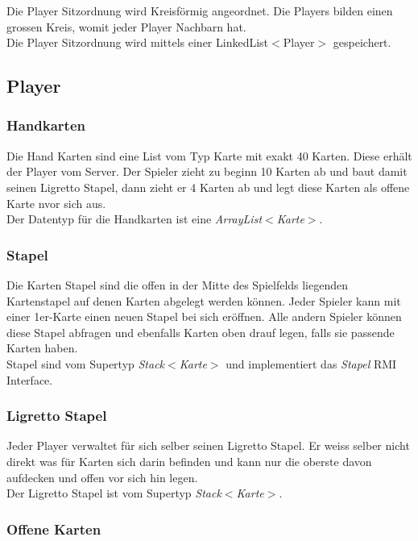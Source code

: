 Die Player Sitzordnung wird Kreisförmig angeordnet. Die Players bilden einen grossen Kreis, womit jeder Player Nachbarn hat. \\[3mm]
Die Player Sitzordnung wird mittels einer LinkedList$<$Player$>$ gespeichert.

\subsection{Player}

\subsubsection{Handkarten}

Die Hand Karten sind eine List vom Typ Karte mit exakt 40 Karten. Diese erhält der Player vom Server. Der Spieler zieht zu beginn 10 Karten ab und baut damit seinen Ligretto Stapel, dann zieht er 4 Karten ab und legt diese Karten als offene Karte nvor sich aus.\\[3mm]
Der Datentyp für die Handkarten ist eine \textit{ArrayList$<$Karte$>$}.

\subsubsection{Stapel}

Die Karten Stapel sind die offen in der Mitte des Spielfelds liegenden Kartenstapel auf denen Karten abgelegt werden können. Jeder Spieler kann mit einer 1er-Karte einen neuen Stapel bei sich eröffnen. Alle andern Spieler können diese Stapel abfragen und ebenfalls Karten oben drauf legen, falls sie passende Karten haben.\\[3mm]
Stapel sind vom Supertyp \textit{Stack$<$Karte$>$} und implementiert das \textit{Stapel} RMI Interface.

\subsubsection{Ligretto Stapel}

Jeder Player verwaltet für sich selber seinen Ligretto Stapel. Er weiss selber nicht direkt was für Karten sich darin befinden und kann nur die oberste davon aufdecken und offen vor sich hin legen.\\[3mm]
Der Ligretto Stapel ist vom Supertyp \textit{Stack$<$Karte$>$}.

\subsubsection{Offene Karten}

